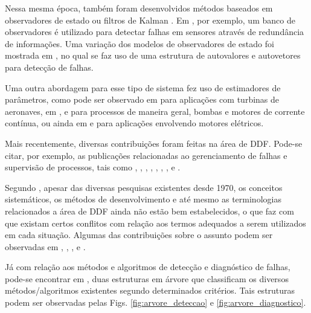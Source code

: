 Nessa mesma época, também foram desenvolvidos métodos baseados em observadores
de estado ou filtros de Kalman \cite{beard:1971,mehra:1971,jones:1973}. Em
, por exemplo, um banco de observadores é utilizado para
detectar falhas em sensores através de redundância de informações. Uma variação
dos modelos de observadores de estado foi mostrada em ,
no qual se faz uso de uma estrutura de autovalores e autovetores para detecção
de falhas.

Uma outra abordagem para esse tipo de sistema fez uso de estimadores de
parâmetros, como pode ser observado em  para
aplicações com turbinas de aeronaves, em ,
 e  para processos de
maneira geral, bombas e motores de corrente contínua, ou ainda em
 e  para aplicações envolvendo
motores elétricos.

Mais recentemente, diversas contribuições foram feitas na área de DDF. Pode-se
citar, por exemplo, as publicações relacionadas ao gerenciamento de falhas e
supervisão de processos, tais como ,
, , ,
, , ,
 e .

Segundo , apesar das diversas pesquisas existentes desde
1970, os conceitos sistemáticos, os métodos de desenvolvimento e até mesmo as
terminologias relacionados a área de DDF ainda não estão bem estabelecidos, o
que faz com que existam certos conflitos com relação aos termos adequados a
serem utilizados em cada situação. Algumas das contribuições sobre o assunto
podem ser observadas em , ,
,  e .

Já com relação aos métodos e algoritmos de detecção e diagnóstico de falhas,
pode-se encontrar em , duas estruturas em árvore que
classificam os diversos métodos/al\-go\-rit\-mos existentes segundo determinados
critérios. Tais estruturas podem ser observadas pelas Figs.
\ref{fig:arvore_deteccao} e \ref{fig:arvore_diagnostico}.

